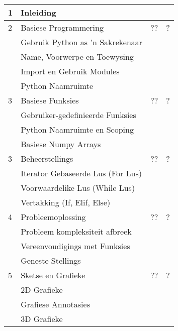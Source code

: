 \begin{longtable}{|p{2.0cm}|p{7.6cm}|p{2.0cm}|p{1.8cm}|}
             1  & Inleiding                                    &    &    \\
             \hline
             2  & Basiese Programmering                        & ?? & ?  \\
                & \qquad Gebruik Python as 'n Sakrekenaar      &    &    \\
                & \qquad Name, Voorwerpe en Toewysing          &    &    \\
                & \qquad Import en Gebruik Modules             &    &    \\
                & \qquad Python Naamruimte                     &    &    \\
             \hline
             3  & Basiese Funksies                             & ?? & ?  \\
                & \qquad Gebruiker-gedefinieerde Funksies      &    &    \\
                & \qquad Python Naamruimte en Scoping          &    &    \\
                & \qquad Basiese Numpy Arrays                  &    &    \\
             \hline
             3  & Beheerstellings                              & ?? & ?  \\
                & \qquad Iterator Gebaseerde Lus  (For Lus)    &    &    \\
                & \qquad Voorwaardelike Lus  (While Lus)       &    &    \\
                & \qquad Vertakking (If, Elif, Else)           &    &    \\
             \hline
             4  & Probleemoplossing                            & ?? & ?  \\
                & \qquad Probleem kompleksiteit afbreek        &    &    \\
                & \qquad Vereenvoudigings met Funksies         &    &    \\
                & \qquad Geneste Stellings                     &    &    \\
             \hline
             5  & Sketse en Grafieke                           & ?? & ?  \\
                & \qquad 2D Grafieke                           &    &    \\
                & \qquad Grafiese Annotasies                   &    &    \\
                & \qquad 3D Grafieke                           &    &    \\

\end{longtable}
